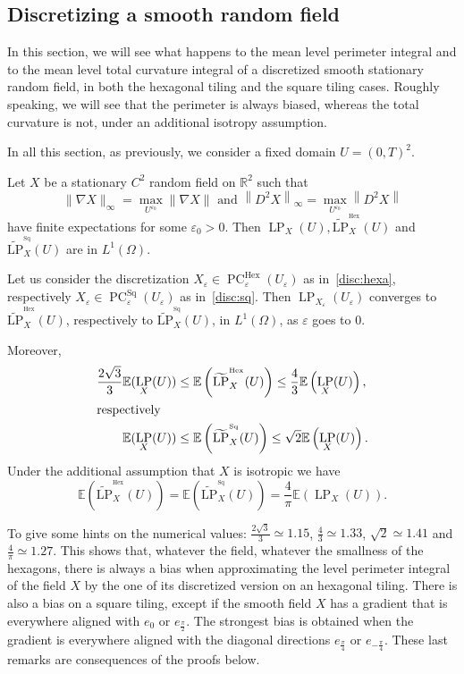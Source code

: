 \documentclass[10pt]{amsart}
\theoremstyle{definition}\newtheorem{defi}[theo]{Definition}\newtheorem{rema}[theo]{Remark}\newtheorem{exam}[theo]{Example}\newtheorem{exem}[theo]{Example}\newtheorem{nota}[theo]{Notation}
\newcommand{\R}{\mathbb{R}}
\newcommand{\E}{\mathbb{E}}
\newcommand{\eps}{\varepsilon}
\DeclareMathOperator{\LP}{LP}
\DeclareMathOperator{\PC}{PC}
\DeclareMathOperator{\Hex}{Hex}
\DeclareMathOperator{\Sq}{Sq}
\newcommand{\tLP}{\widetilde{\mathrm{LP}}}
\begin{document}
\subsection{Discretizing a smooth random field}

In this section, we will see what happens to the mean level perimeter integral and to the mean level total curvature integral of a discretized smooth stationary random field, in both the hexagonal tiling and the square tiling cases. Roughly speaking, we will see that the perimeter is always biased, whereas the total curvature is not, under an additional isotropy assumption. 


In all this section, as previously, we consider a fixed domain $U=(0,T)^2$.



\begin{prop}\label{cvgce:LP}
Let $X$ be a stationary $C^2$ random field on $\R^2$ such that \[
\|\nabla X\|_\infty=\underset{U^{\eps_0}}{\max}\|\nabla X\|\text{ and }\left\|D^2 X\right\|_\infty=\underset{U^{\eps_0}}{\max}\left\|D^2 X\right\|
\]
have finite expectations for some $\eps_0>0$. Then $\LP_X(U), \tLP^{^{\Hex}}_{X}(U)$ and $\tLP^{^{\Sq}}_{X}(U)$ are in $L^1(\Omega)$.


Let us consider the discretization $X_\eps \in \PC_\eps^{\Hex}(U_\eps)$ as in~\eqref{disc:hexa}, respectively $X_\eps \in \PC_\eps^{\Sq}(U_\eps)$ as in~\eqref{disc:sq}. Then $\LP_{X_\eps}(U_\eps)$ converges to $\tLP^{^{\Hex}}_{X}(U)$, respectively to $\tLP^{^{\Sq}}_{X}(U)$, in $L^1(\Omega)$, as $\eps$ goes to $0$.


Moreover,
\begin{align*}
\frac{2\sqrt{3}}{3} \E(\LP_{X}(U)) &\leq
\E\left(\tLP^{^{\Hex}}_{X}(U)\right) \leq \frac{4}{3} \E\left(\LP_{X}(U)\right),
\\
\intertext{respectively}
\E(\LP_{X}(U)) &\leq \E\left(\tLP^{^{\Sq}}_{X}(U)\right) \leq \sqrt{2} \E\left(\LP_{X}(U)\right).
\end{align*}
Under the additional assumption that $X$ is isotropic we have
\[
\E\left(\tLP^{^{\Hex}}_{X}(U)\right) = \E\left(\tLP^{^{\Sq}}_{X}(U)\right) =
\frac{4}{\pi} \E\left(\LP_{X}(U)\right).
\]
\end{prop}

To give some hints on the numerical values: $\tfrac{2\sqrt{3}}{3}\simeq 1.15$, $\tfrac{4}{3} \simeq 1.33$, $\sqrt{2} \simeq 1.41$ and $\tfrac{4}{\pi} \simeq 1.27$. This shows that, whatever the field, whatever the smallness of the hexagons, there is always a bias when approximating the level perimeter integral of the field $X$ by the one of its discretized version on an hexagonal tiling. There is also a bias on a square tiling, except if the smooth field $X$ has a gradient that is everywhere aligned with $e_0$ or $e_{\frac{\pi}{2}}$. The strongest bias is obtained when the gradient is everywhere aligned with the diagonal directions $e_{\frac{\pi}{4}}$ or $e_{-\frac{\pi}{4}}$. These last remarks are consequences of the proofs below.
\end{document}
